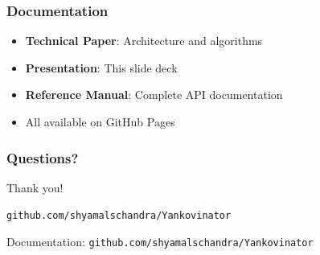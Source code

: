\documentclass[aspectratio=169]{beamer}
\begin{document}
\begin{frame}
\frametitle{Documentation}
\begin{itemize}
    \item \textbf{Technical Paper}: Architecture and algorithms
    \item \textbf{Presentation}: This slide deck
    \item \textbf{Reference Manual}: Complete API documentation
    \item All available on GitHub Pages
\end{itemize}
\end{frame}

\begin{frame}
\frametitle{Questions?}
\begin{center}
\Large
Thank you!

\vspace{1cm}
\texttt{github.com/shyamalschandra/Yankovinator}

\vspace{0.5cm}
\small
Documentation: \texttt{github.com/shyamalschandra/Yankovinator}
\end{center}
\end{frame}
\end{document}
